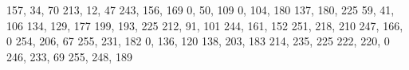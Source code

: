 \documentclass{scrartcl}
\begin{document}
	
	\definecolor{unired1}{RGB}			{157,  34,  70}
	\definecolor{unired2}{RGB}			{213,  12,  47}  %
	\definecolor{unired3}{RGB}			{243, 156, 169}
	\definecolor{uniblue1}{RGB}			{  0,  50, 109}  %
	\definecolor{uniblue2}{RGB}			{  0, 104, 180}
	\definecolor{uniblue3}{RGB}			{137, 180, 225}
	\definecolor{unipurple1}{RGB}		{ 59,  41, 106}
	\definecolor{unipurple2}{RGB}		{134, 129, 177}
	\definecolor{unipurple3}{RGB}		{199, 193, 225}
	\definecolor{unipeach1}{RGB}		{212,  91, 101}
	\definecolor{unipeach2}{RGB}		{244, 161, 152}
	\definecolor{unipeach3}{RGB}		{251, 218, 210}
	\definecolor{uniorange1}{RGB}		{247, 166,   0}
	\definecolor{uniorange2}{RGB}		{254, 206,  67}
	\definecolor{uniorange3}{RGB}		{255, 231, 182}
	\definecolor{unigreen1}{RGB}		{  0, 136, 120}
	\definecolor{unigreen2}{RGB}		{138, 203, 183}
	\definecolor{unigreen3}{RGB}		{214, 235, 225}
	\definecolor{uniyellow1}{RGB}		{222, 220,   0}
	\definecolor{uniyellow2}{RGB}		{246, 233,  69}
	\definecolor{uniyellow3}{RGB}		{255, 248, 189}
	
	
	
	
	
	
	
\end{document}
